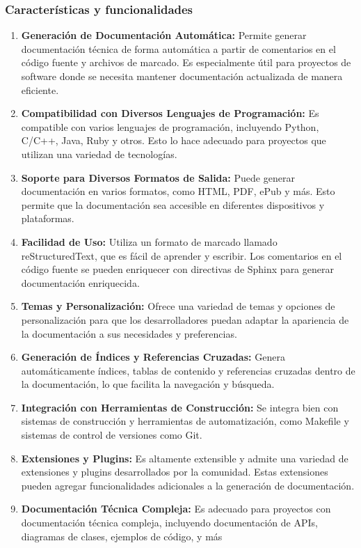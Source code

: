 \documentclass[letterpaper]{article}
\begin{document}
\subsubsection{Características y funcionalidades}
\begin{enumerate}[series=listWWNumxv,label=\arabic*.,ref=\arabic*]
\item \textbf{Generación de Documentación Automática:} Permite generar documentación técnica de forma automática a
partir de comentarios en el código fuente y archivos de marcado. Es especialmente útil para proyectos de software donde
se necesita mantener documentación actualizada de manera eficiente.
\item \textbf{Compatibilidad con Diversos Lenguajes de Programación:} Es compatible con varios lenguajes de
programación, incluyendo Python, C/C++, Java, Ruby y otros. Esto lo hace adecuado para proyectos que utilizan una
variedad de tecnologías.
\item \textbf{Soporte para Diversos Formatos de Salida:} Puede generar documentación en varios formatos, como HTML, PDF,
ePub y más. Esto permite que la documentación sea accesible en diferentes dispositivos y plataformas.
\item \textbf{Facilidad de Uso:} Utiliza un formato de marcado llamado reStructuredText, que es fácil de aprender y
escribir. Los comentarios en el código fuente se pueden enriquecer con directivas de Sphinx para generar documentación
enriquecida.
\item \textbf{Temas y Personalización:} Ofrece una variedad de temas y opciones de personalización para que los
desarrolladores puedan adaptar la apariencia de la documentación a sus necesidades y preferencias.
\item \textbf{Generación de Índices y Referencias Cruzadas:} Genera automáticamente índices, tablas de contenido y
referencias cruzadas dentro de la documentación, lo que facilita la navegación y búsqueda.
\item \textbf{Integración con Herramientas de Construcción:} Se integra bien con sistemas de construcción y herramientas
de automatización, como Makefile y sistemas de control de versiones como Git.
\item \textbf{Extensiones y Plugins:} Es altamente extensible y admite una variedad de extensiones y plugins
desarrollados por la comunidad. Estas extensiones pueden agregar funcionalidades adicionales a la generación de
documentación.
\item \textbf{Documentación Técnica Compleja:} Es adecuado para proyectos con documentación técnica compleja, incluyendo
documentación de APIs, diagramas de clases, ejemplos de código, y más
\end{enumerate}
\end{document}
